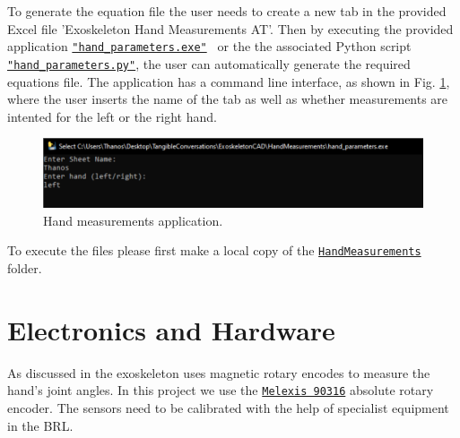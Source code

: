 To generate the equation file the user needs to create a new tab in the 
provided Excel file 'Exoskeleton Hand Measurements AT'. Then
by executing the provided application
\texttt{\href{https://tinyurl.com/mrjjk566}{"hand\_parameters.exe"} } or the 
the associated Python script
\texttt{\href{https://tinyurl.com/yjefhtxr}{"hand\_parameters.py"}},
the user can automatically generate the required 
equations file. The application has a command line interface, as shown in 
Fig. \ref{fig:hand_measurements_application}, where the user inserts
the name of the tab as well as whether measurements are intented for the
left or the right hand.
\begin{figure}[h]
    \centering\includegraphics[width=1.0 \linewidth]{Figures/hand_measurements_script.pdf}
    \caption{Hand measurements application.}
    \label{fig:hand_measurements_application}
\end{figure}
To execute the files please first make a local copy of the 
\texttt{\href{https://tinyurl.com/2p9ar4a3}{HandMeasurements}} folder.

\section{Electronics and Hardware}
As discussed in \cite{tj_a_taiwo_exoskeleton_2021} the exoskeleton uses 
magnetic rotary encodes to measure the hand's joint angles.
In this project we use the
\texttt{\href{https://tinyurl.com/2rdkw8fr}{Melexis 90316}}
absolute rotary encoder. The sensors need to be calibrated with the 
help of specialist equipment in the BRL.

